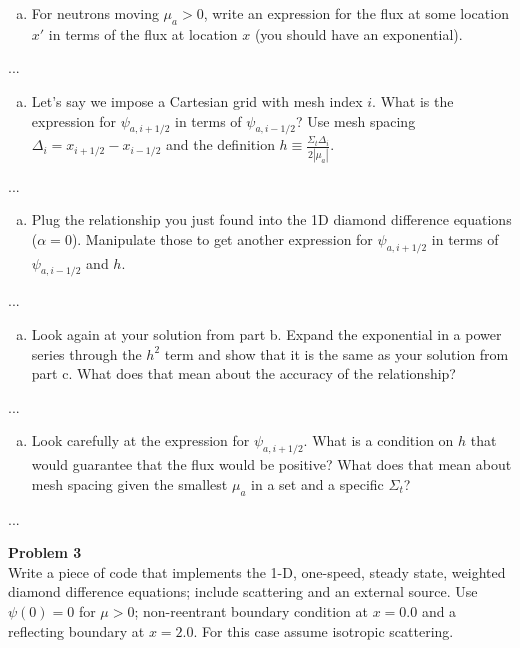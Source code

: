 \documentclass[10pt]{article}
\begin{document}
\begin{enumerate}[(a)]
\item For neutrons moving $\mu_a > 0$, write an expression for the flux at some location $x'$ in terms of the flux at location $x$ (you should have an exponential).
\end{enumerate}

...


\begin{enumerate}[(b)]
\item Let's say we impose a Cartesian grid with mesh index $i$. What is the expression for $\psi_{a,i+1/2}$ in terms of $\psi_{a,i-1/2}$? Use mesh spacing $\Delta_i = x_{i+1/2} - x_{i-1/2}$ and the definition $h \equiv \frac{\Sigma_t \Delta_i}{2|\mu_a|}$.
\end{enumerate}

...


\begin{enumerate}[(c)]
\item Plug the relationship you just found into the 1D diamond difference equations ($\alpha = 0$). Manipulate those to get another expression for
 $\psi_{a,i+1/2}$ in terms of $\psi_{a,i-1/2}$ and $h$.  
\end{enumerate}

...


\begin{enumerate}[(d)]
\item Look again at your solution from part b. Expand the exponential in a power series through the $h^2$ term and show that it is the same as your solution from part c. What does that mean about the accuracy of the relationship?
\end{enumerate}

...


\begin{enumerate}[(e)]
\item Look carefully at the expression for 
$\psi_{a,i+1/2}$. What is a condition on $h$ that would guarantee that the flux would be positive? What does that mean about mesh spacing given the smallest $\mu_a$ in a set and a specific $\Sigma_t$? 
\end{enumerate}

...






\newpage
\noindent \textbf{Problem 3}\\
Write a piece of code that implements the 1-D, one-speed, steady state, weighted diamond difference equations; include scattering and an external source. Use $\psi(0) = 0$ for $\mu > 0$; non-reentrant boundary condition at $x=0.0$ and a reflecting boundary at $x=2.0$. For this case assume isotropic scattering.
\end{document}
